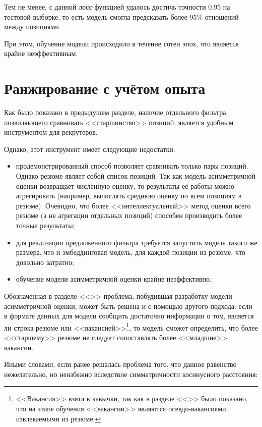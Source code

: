 \documentclass[14pt]{mmcs_article}
\begin{document}
Тем не менее, с данной лосс-функцией удалось достичь точности 0.95 на тестовой выборке, то есть модель смогла предсказать более 95\% отношений между позициями.

При этом, обучение модели происходило в течение сотен эпох, что является крайне неэффективным.


\newpage
\section{Ранжирование с учётом опыта}\label{experience_ranking}

Как было показано в предыдущем разделе, наличие отдельного фильтра, позволяющего сравнивать <<старшинство>> позиций, является удобным инструментом для рекрутеров.

Однако, этот инструмент имеет следующие недостатки:

\begin{itemize}
  \item продемонстрированный способ позволяет сравнивать только пары позиций. Однако резюме являет собой список позиций. Так как модель асимметричной оценки возвращает численную оценку, то результаты её работы можно агрегировать (например, вычислять среднюю оценку по всем позициям в резюме). Очевидно, что более <<интеллектуальный>> метод оценки всего резюме (а не агрегации отдельных позиций) способен производить более точные результаты;
  \item для реализации предложенного фильтра требуется запустить модель такого же размера, что и эмбеддинговая модель, для каждой позиции из резюме, что довольно затратно;
  \item обучение модели асимметричной оценки крайне неэффективно.
\end{itemize}

Обозначенная в разделе <<>> проблема, побудившая разработку модели асимметричной оценки, может быть решена и с помощью другого подхода: если в формате данных для модели сообщить достаточно информации о том, является ли строка резюме или <<вакансией>>\footnote{<<Вакансия>> взята в кавычки, так как в разделе <<>> было показано, что на этапе обучения <<вакансии>> являются псевдо-вакансиями, извлекаемыми из резюме.}, то модель сможет определить, что более <<старшему>> резюме не следует сопоставлять более <<младшие>> вакансии.

Иными словами, если ранее решалась проблема того, что данное равенство нежелательно, но неизбежно вследствие симметричности косинусного расстояния:
\end{document}
